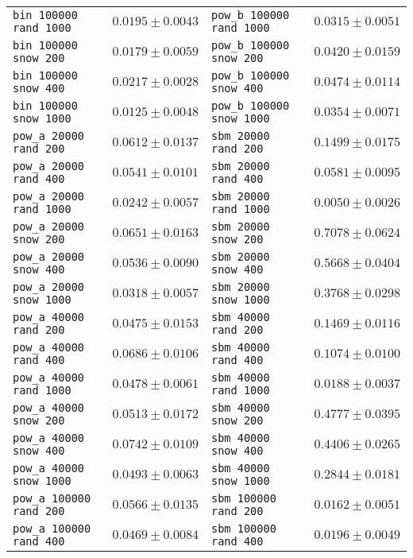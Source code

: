 \begin{table*}
\begin{tabular}{lc|lc}
\texttt{bin 100000 rand 1000} & $0.0195 \pm 0.0043$ & \texttt{pow\_b 100000 rand 1000} & $0.0315 \pm 0.0051$ \\
\texttt{bin 100000 snow 200} & $0.0179 \pm 0.0059$ & \texttt{pow\_b 100000 snow 200} & $0.0420 \pm 0.0159$ \\
\texttt{bin 100000 snow 400} & $0.0217 \pm 0.0028$ & \texttt{pow\_b 100000 snow 400} & $0.0474 \pm 0.0114$ \\
\texttt{bin 100000 snow 1000} & $0.0125 \pm 0.0048$ & \texttt{pow\_b 100000 snow 1000} & $0.0354 \pm 0.0071$ \\
\midrule
\texttt{pow\_a 20000 rand 200} & $0.0612 \pm 0.0137$ & \texttt{sbm 20000 rand 200} & $0.1499 \pm 0.0175$ \\
\texttt{pow\_a 20000 rand 400} & $0.0541 \pm 0.0101$ & \texttt{sbm 20000 rand 400} & $0.0581 \pm 0.0095$ \\
\texttt{pow\_a 20000 rand 1000} & $0.0242 \pm 0.0057$ & \texttt{sbm 20000 rand 1000} & $0.0050 \pm 0.0026$ \\
\texttt{pow\_a 20000 snow 200} & $0.0651 \pm 0.0163$ & \texttt{sbm 20000 snow 200} & $0.7078 \pm 0.0624$ \\
\texttt{pow\_a 20000 snow 400} & $0.0536 \pm 0.0090$ & \texttt{sbm 20000 snow 400} & $0.5668 \pm 0.0404$ \\
\texttt{pow\_a 20000 snow 1000} & $0.0318 \pm 0.0057$ & \texttt{sbm 20000 snow 1000} & $0.3768 \pm 0.0298$ \\
\texttt{pow\_a 40000 rand 200} & $0.0475 \pm 0.0153$ & \texttt{sbm 40000 rand 200} & $0.1469 \pm 0.0116$ \\
\texttt{pow\_a 40000 rand 400} & $0.0686 \pm 0.0106$ & \texttt{sbm 40000 rand 400} & $0.1074 \pm 0.0100$ \\
\texttt{pow\_a 40000 rand 1000} & $0.0478 \pm 0.0061$ & \texttt{sbm 40000 rand 1000} & $0.0188 \pm 0.0037$ \\
\texttt{pow\_a 40000 snow 200} & $0.0513 \pm 0.0172$ & \texttt{sbm 40000 snow 200} & $0.4777 \pm 0.0395$ \\
\texttt{pow\_a 40000 snow 400} & $0.0742 \pm 0.0109$ & \texttt{sbm 40000 snow 400} & $0.4406 \pm 0.0265$ \\
\texttt{pow\_a 40000 snow 1000} & $0.0493 \pm 0.0063$ & \texttt{sbm 40000 snow 1000} & $0.2844 \pm 0.0181$ \\
\texttt{pow\_a 100000 rand 200} & $0.0566 \pm 0.0135$ & \texttt{sbm 100000 rand 200} & $0.0162 \pm 0.0051$ \\
\texttt{pow\_a 100000 rand 400} & $0.0469 \pm 0.0084$ & \texttt{sbm 100000 rand 400} & $0.0196 \pm 0.0049$ \\

\end{tabular}
\end{table*}
